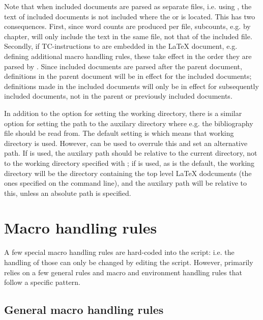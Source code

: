 \documentclass{article}
\begin{document}
Note that when included documents are parsed as separate files, i.e. using , the text of included documents is not included where the  or  is located. This has two consequences. First, since word counts are produced per file, subcounts, e.g. by chapter, will only include the text in the same file, not that of the included file. Secondly, if TC-instructions to \TeXcount{} are embedded in the \LaTeX{} document, e.g. defining additional macro handling rules, these take effect in the order they are parsed by \TeXcount{}. Since included documents are parsed after the parent document, definitions in the parent document will be in effect for the included documents; definitions made in the included documents will only be in effect for subsequently included documents, not in the parent or previously included documents.

In addition to the  option for setting the working directory, there is a similar option  for setting the path to the auxilary directory where e.g. the bibliography  file should be read from. The default setting is  which means that working directory is used. However,  can be used to overrule this and set an alternative path. If  is used, the auxilary path should be relative to the current directory, not to the working directory specified with ; if  is used, as is the default, the working directory will be the directory containing the top level \LaTeX{} dodcuments (the ones specified on the command line), and the auxilary path will be relative to this, unless an absolute path is specified.




\section{Macro handling rules}

A few special macro handling rules are hard-coded into the \TeXcount{} script: i.e. the handling of those can only be changed by editing the script. However, \TeXcount{} primarily relies on a few general rules and macro and environment handling rules that follow a specific pattern.


\subsection{General macro handling rules}
\end{document}
